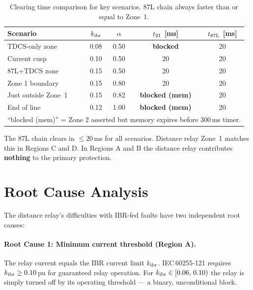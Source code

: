 \documentclass[11pt,a4paper]{article}
\begin{document}
\begin{table}[h!]
\centering
\caption{Clearing time comparison for key scenarios.
         87L chain always faster than or equal to Zone~1.}
\label{tab:clearing}
\begin{tabular}{lcccc}
\toprule
Scenario & $k_{\rm ibr}$ & $\alpha$ & $t_{\rm 21}$ [ms] & $t_{\rm 87L}$ [ms] \\
\midrule
TDCS-only zone             & 0.08 & 0.50 & \textbf{blocked} & 20 \\
Current cusp               & 0.10 & 0.50 & 20               & 20 \\
87L+TDCS zone              & 0.15 & 0.50 & 20               & 20 \\
Zone 1 boundary            & 0.15 & 0.80 & 20               & 20 \\
Just outside Zone~1        & 0.15 & 0.82 & \textbf{blocked (mem)} & 20 \\
End of line                & 0.12 & 1.00 & \textbf{blocked (mem)} & 20 \\
\bottomrule
\multicolumn{5}{l}{\footnotesize ``blocked (mem)'' = Zone 2 asserted but memory expires before 300\,ms timer.}
\end{tabular}
\end{table}

The 87L chain clears in $\leq 20$\,ms for all scenarios.  Distance
relay Zone~1 matches this in Regions C and D.  In Regions A and B the
distance relay contributes \textbf{nothing} to the primary protection.

\section{Root Cause Analysis}

The distance relay's difficulties with IBR-fed faults have two independent
root causes:

\paragraph{Root Cause 1: Minimum current threshold (Region A).}
The relay current equals the IBR current limit $k_{\rm ibr}$.
IEC\,60255-121 requires $k_{\rm ibr} \geq 0.10$\,pu for guaranteed relay
operation.  For $k_{\rm ibr} \in [0.06,\,0.10)$ the relay is simply
turned off by its operating threshold — a binary, unconditional block.
\end{document}
